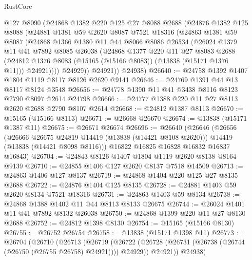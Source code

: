 \begin{lexlean}{RustCore}
\begin{coremodule}
        @127
        @8090
        (@24868
          @1382
          @220
          @125
          @27
          @8088
          @2688
          (@24876
            @1382
            @125
            @8088
            (@24881
              @1381
              @59
              @2620
              @8087
              @7521
              @18316
              (@24863
                @1381
                @59
                @8087
                (@24868
                  @1366
                  @1380
                  @11
                  @44
                  @8066
                  @8086
                  @26534
                  (@26024
                    @1379
                    @11
                    @41
                    @7892
                    @8085
                    @26038
                    (@24868
                      @1377
                      @220
                      @11
                      @27
                      @8083
                      @2688
                      (@24812 @1376 @8083 (@15165 (@15166 @8083)) (@13838 (@15171 @1376 @11)))
                      @24921))))
              @24929))
          @24921))
      @24938)
@26640 := @24758 @1392 @1407 @1804 @1119 @8117 @8126 @2620 @9141
@26646 := @24769 @1391 @44 @13 @8117 @8124 @3548
@26656 := @24778 @1390 @11 @41 @3438 @8116 @8123 @2790 @8097 @2614 @24798
@26666 := @24777 @1388 @220 @11 @27 @8113 @2620 @2688 @2790 @8107 @2614
@26668 := @24812 @1387 @8113
@26670 := @15165 (@15166 @8113)
@26671 := @26668 @26670
@26674 := @13838 (@15171 @1387 @11)
@26675 := @26671 @26674
@26696 := @26640
    (@26646
      (@26656
        (@26666 @26675 @24819 @14419 (@13838 (@14421 @8108 @2620)))
        @14419
        (@13838 (@14421 @8098 @8116)))
      @16822
      @16825
      @16828
      @16832
      @16837
      @16843)
@26704 := @24843 @8126 @1407 @1804 @1119 @2620 @8138 @8164 @9139
@26710 := @24855 @1406 @127 @2620 @8137 @7518 @14509
@26713 := @24863 @1406 @127 @8137
@26719 := @24868 @1404 @220 @125 @27 @8135 @2688
@26722 := @24876 @1404 @125 @8135
@26728 := @24881 @1403 @59 @2620 @8134 @7521 @18316
@26731 := @24863 @1403 @59 @8134
@26738 := @24868 @1388 @1402 @11 @44 @8113 @8133 @26675
@26744 := @26024 @1401 @11 @41 @7892 @8132 @26038
@26750 := @24868 @1399 @220 @11 @27 @8130 @2688
@26752 := @24812 @1398 @8130
@26754 := @15165 (@15166 @8130)
@26755 := @26752 @26754
@26758 := @13838 (@15171 @1398 @11)
@26773 := @26704
    (@26710
      (@26713
        (@26719
          (@26722 (@26728 (@26731 (@26738 (@26744 (@26750 (@26755 @26758) @24921)))) @24929))
          @24921))
      @24938)

\end{coremodule}
\end{lexlean}
